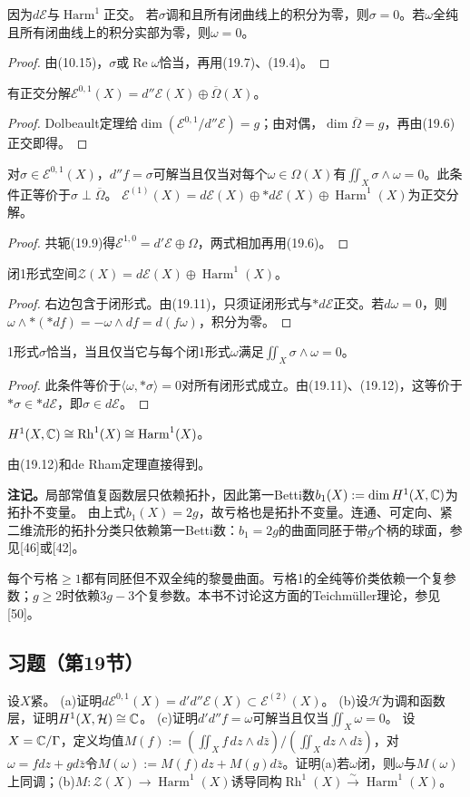 因为$d\mathcal E$与$\operatorname{Harm}^1$正交。
若$\sigma$调和且所有闭曲线上的积分为零，则$\sigma=0$。若$\omega$全纯且所有闭曲线上的积分实部为零，则$\omega=0$。
\begin{proof}
由(10.15)，$\sigma$或$\operatorname{Re}\omega$恰当，再用(19.7)、(19.4)。
\end{proof}
有正交分解$\mathcal E^{0,1}(X)=d''\mathcal E(X)\oplus\overline\Omega(X)$。
\begin{proof}
Dolbeault定理给$\dim(\mathcal E^{0,1}/d''\mathcal E)=g$；由对偶，$\dim\overline\Omega=g$，再由(19.6)正交即得。
\end{proof}
对$\sigma\in\mathcal E^{0,1}(X)$，$d''f=\sigma$可解当且仅当对每个$\omega\in\Omega(X)$有$\iint_X\sigma\wedge\omega=0$。此条件正等价于$\sigma\perp\overline\Omega$。
$\mathcal E^{(1)}(X)=d\mathcal E(X)\oplus*d\mathcal E(X)\oplus\operatorname{Harm}^1(X)$为正交分解。
\begin{proof}
共轭(19.9)得$\mathcal E^{1,0}=d'\mathcal E\oplus\Omega$，两式相加再用(19.6)。
\end{proof}
闭1形式空间$\mathcal Z(X)=d\mathcal E(X)\oplus\operatorname{Harm}^1(X)$。
\begin{proof}
右边包含于闭形式。由(19.11)，只须证闭形式与$*d\mathcal E$正交。若$d\omega=0$，则$\omega\wedge*(*df)=-\omega\wedge df=d(f\omega)$，积分为零。
\end{proof}
1形式$\sigma$恰当，当且仅当它与每个闭1形式$\omega$满足$\iint_X\sigma\wedge\omega=0$。
\begin{proof}
此条件等价于$\langle\omega,*\sigma\rangle=0$对所有闭形式成立。由(19.11)、(19.12)，这等价于$*\sigma\in*d\mathcal E$，即$\sigma\in d\mathcal E$。
\end{proof}
$H^1(X,\mathbb C)\cong\operatorname{Rh}^1(X)\cong\operatorname{Harm}^1(X)$。

由(19.12)和de Rham定理直接得到。

\textbf{注记。}局部常值复函数层只依赖拓扑，因此第一Betti数$b_1(X):=\dim H^1(X,\mathbb C)$为拓扑不变量。
由上式$b_1(X)=2g$，故亏格也是拓扑不变量。连通、可定向、紧二维流形的拓扑分类只依赖第一Betti数：$b_1=2g$的曲面同胚于带$g$个柄的球面，参见[46]或[42]。

每个亏格$\ge1$都有同胚但不双全纯的黎曼曲面。亏格1的全纯等价类依赖一个复参数；$g\ge2$时依赖$3g-3$个复参数。本书不讨论这方面的Teichmüller理论，参见[50]。
\subsection*{习题（第19节）}
设$X$紧。
(a)证明$d\mathcal E^{0,1}(X)=d'd''\mathcal E(X)\subset\mathcal E^{(2)}(X)$。
(b)设$\mathcal H$为调和函数层，证明$H^1(X,\mathcal H)\cong\mathbb C$。
(c)证明$d'd''f=\omega$可解当且仅当$\iint_X\omega=0$。
设$X=\mathbb C/\Gamma$，定义均值$M(f):=(\iint_Xf\,dz\wedge d\bar z)/(\iint_Xdz\wedge d\bar z)$，对$\omega=f dz+g d\bar z$令$M(\omega):=M(f)dz+M(g)d\bar z$。证明(a)若$\omega$闭，则$\omega$与$M(\omega)$上同调；(b)$M:\mathcal Z(X)\to\operatorname{Harm}^1(X)$诱导同构$\operatorname{Rh}^1(X)\xrightarrow{\sim}\operatorname{Harm}^1(X)$。

